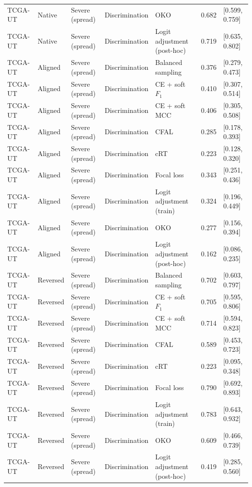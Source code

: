 \begin{longtable}{lllllll}
TCGA-UT & Native & Severe (spread) & Discrimination & OKO & 0.682 & [0.599, 0.759] \\
TCGA-UT & Native & Severe (spread) & Discrimination & Logit adjustment (post-hoc) & 0.719 & [0.635, 0.802] \\
TCGA-UT & Aligned & Severe (spread) & Discrimination & Balanced sampling & 0.376 & [0.279, 0.473] \\
TCGA-UT & Aligned & Severe (spread) & Discrimination & CE + soft $F_1$ & 0.410 & [0.307, 0.514] \\
TCGA-UT & Aligned & Severe (spread) & Discrimination & CE + soft MCC & 0.406 & [0.305, 0.508] \\
TCGA-UT & Aligned & Severe (spread) & Discrimination & CFAL & 0.285 & [0.178, 0.393] \\
TCGA-UT & Aligned & Severe (spread) & Discrimination & cRT & 0.223 & [0.128, 0.320] \\
TCGA-UT & Aligned & Severe (spread) & Discrimination & Focal loss & 0.343 & [0.251, 0.436] \\
TCGA-UT & Aligned & Severe (spread) & Discrimination & Logit adjustment (train) & 0.324 & [0.196, 0.449] \\
TCGA-UT & Aligned & Severe (spread) & Discrimination & OKO & 0.277 & [0.156, 0.394] \\
TCGA-UT & Aligned & Severe (spread) & Discrimination & Logit adjustment (post-hoc) & 0.162 & [0.086, 0.235] \\
TCGA-UT & Reversed & Severe (spread) & Discrimination & Balanced sampling & 0.702 & [0.603, 0.797] \\
TCGA-UT & Reversed & Severe (spread) & Discrimination & CE + soft $F_1$ & 0.705 & [0.595, 0.806] \\
TCGA-UT & Reversed & Severe (spread) & Discrimination & CE + soft MCC & 0.714 & [0.594, 0.823] \\
TCGA-UT & Reversed & Severe (spread) & Discrimination & CFAL & 0.589 & [0.453, 0.723] \\
TCGA-UT & Reversed & Severe (spread) & Discrimination & cRT & 0.223 & [0.095, 0.348] \\
TCGA-UT & Reversed & Severe (spread) & Discrimination & Focal loss & 0.790 & [0.692, 0.893] \\
TCGA-UT & Reversed & Severe (spread) & Discrimination & Logit adjustment (train) & 0.783 & [0.643, 0.932] \\
TCGA-UT & Reversed & Severe (spread) & Discrimination & OKO & 0.609 & [0.466, 0.739] \\
TCGA-UT & Reversed & Severe (spread) & Discrimination & Logit adjustment (post-hoc) & 0.419 & [0.285, 0.560] \\

\end{longtable}
